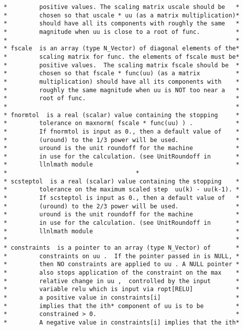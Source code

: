 \documentclass[11pt]{article}
\begin{document}
\begin{verbatim}
 *         positive values. The scaling matrix uscale should be   *
 *         chosen so that uscale * uu (as a matrix multiplication)*
 *         should have all its components with roughly the same   *
 *         magnitude when uu is close to a root of func.          *
 *                                                                *
 * fscale  is an array (type N_Vector) of diagonal elements of the*
 *         scaling matrix for func. the elements of fscale must be*
 *         positive values.  The scaling matrix fscale should be  *
 *         chosen so that fscale * func(uu) (as a matrix          *
 *         multiplication) should have all its components with    *
 *         roughly the same magnitude when uu is NOT too near a   *
 *         root of func.                                          *
 *                                                                *
 * fnormtol  is a real (scalar) value containing the stopping     *
 *         tolerance on maxnorm( fscale * func(uu) ) .            *
 *         If fnormtol is input as 0., then a default value of    *
 *         (uround) to the 1/3 power will be used.                *
 *         uround is the unit roundoff for the machine            *
 *         in use for the calculation. (see UnitRoundoff in       *
 *         llnlmath module                                        *
 *                                    *
 * scsteptol  is a real (scalar) value containing the stopping    *
 *         tolerance on the maximum scaled step  uu(k) - uu(k-1). *
 *         If scsteptol is input as 0., then a default value of   *
 *         (uround) to the 2/3 power will be used.                *
 *         uround is the unit roundoff for the machine            *
 *         in use for the calculation. (see UnitRoundoff in       *
 *         llnlmath module                                        *
 *                                                                *
 * constraints  is a pointer to an array (type N_Vector) of       *
 *         constraints on uu .  If the pointer passed in is NULL, *
 *         then NO constraints are applied to uu . A NULL pointer *
 *         also stops application of the constraint on the max    *
 *         relative change in uu ,  controlled by the input       *
 *         variable relu which is input via ropt[RELU]            *
 *         a positive value in constraints[i]                     *
 *         implies that the ith* component of uu is to be         *
 *         constrained > 0.                                       *
 *         A negative value in constraints[i] implies that the ith*

\end{verbatim}
\end{document}
